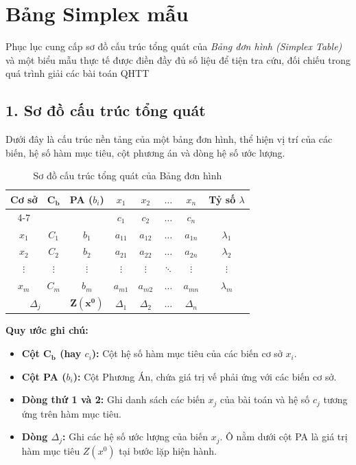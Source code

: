 \chapter{Bảng Simplex mẫu}

Phục lục cung cấp sơ đồ cấu trúc tổng quát của \textit{Bảng đơn hình (Simplex Table)} và một biểu mẫu thực tế được điền đầy đủ số liệu để tiện tra cứu, đối chiếu trong quá trình giải các bài toán QHTT

\section*{1. Sơ đồ cấu trúc tổng quát}
Dưới đây là cấu trúc nền tảng của một bảng đơn hình, thể hiện vị trí của các biến, hệ số hàm mục tiêu, cột phương án và dòng hệ số ước lượng.
\begin{table}[htbp]
    \centering
    \renewcommand{\arraystretch}{1.3}
    \begin{tabular}{|c|c|c|c|c|c|c|c|}
        \hline
        \multirow{2}{*}{\textbf{Cơ sở}} & \multirow{2}{*}{$\mathbf{C_b}$} & \multirow{2}{*}{\textbf{PA ($b_i$)}} & $x_1$ & $x_2$ & $\dots$ & $x_n$ & \multirow{2}{*}{\textbf{Tỷ số $\lambda$}} \\
        \cline{4-7}
        & & & $c_1$ & $c_2$ & $\dots$ & $c_n$ & \\
        \hline
        $x_1$ & $C_1$ & $b_1$ & $a_{11}$ & $a_{12}$ & $\dots$ & $a_{1n}$ & $\lambda_1$ \\
        \hline
        $x_2$ & $C_2$ & $b_2$ & $a_{21}$ & $a_{22}$ & $\dots$ & $a_{2n}$ & $\lambda_2$ \\
        \hline
        $\vdots$ & $\vdots$ & $\vdots$ & $\vdots$ & $\vdots$ & $\ddots$ & $\vdots$ & $\vdots$ \\
        \hline
        $x_m$ & $C_m$ & $b_m$ & $a_{m1}$ & $a_{m2}$ & $\dots$ & $a_{mn}$ & $\lambda_m$ \\
        \hline
        \multicolumn{2}{|c|}{$\Delta_j$} & $\mathbf{Z(x^0)}$ & $\Delta_1$ & $\Delta_2$ & $\dots$ & $\Delta_n$ & \\
        \hline
    \end{tabular}
    \caption{Sơ đồ cấu trúc tổng quát của Bảng đơn hình}
\end{table}

\textbf{Quy ước ghi chú:}
\begin{itemize}
    \item \textbf{Cột $\mathbf{C_b}$ (hay $c_i$):} Cột hệ số hàm mục tiêu của các biến cơ sở $x_i$.
    \item \textbf{Cột PA ($b_i$):} Cột Phương Án, chứa giá trị vế phải ứng với các biến cơ sở.
    \item \textbf{Dòng thứ 1 và 2:} Ghi danh sách các biến $x_j$ của bài toán và hệ số $c_j$ tương ứng trên hàm mục tiêu.
    \item \textbf{Dòng $\Delta_j$:} Ghi các hệ số ước lượng của biến $x_j$. Ô nằm dưới cột PA là giá trị hàm mục tiêu $Z(x^0)$ tại bước lặp hiện hành.
\end{itemize}

